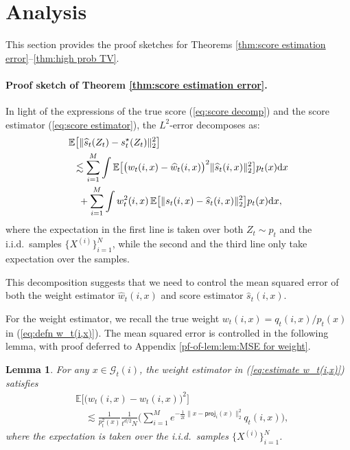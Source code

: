 \documentclass{article}
\newcommand{\bE}{\mathbb{E}}
\newcommand{\diff}{\,\mathrm{d}}
\newcommand{\proj}{\mathsf{proj}}
\theoremstyle{plain}
\newtheorem{lemma}{\bf Lemma}
\theoremstyle{remark}
\begin{document}
\section{Analysis}
\label{sec:proof overview}
This section provides the proof sketches for Theorems \ref{thm:score estimation error}--\ref{thm:high prob TV}.

\paragraph{Proof sketch of Theorem \ref{thm:score estimation error}.}

In light of the expressions of the true score (\ref{eq:score decomp}) and the score estimator (\ref{eq:score estimator}), the $L^2$-error decomposes as:
\begin{align}
    &\mathbb{E}\big[\|\widehat{s}_t(Z_t)-s_t^\star(Z_t)\|_2^2\big] \notag \\
    &\,\,\, \lesssim \sum_{i=1}^M \int \bE\big[\big(w_t(i,x)-\widehat{w}_t(i,x)\big)^2 \|\widehat{s}_t(i,x) \|_2^2 \big] p_t(x) \!\diff x \notag\\
    &\quad + \sum_{i=1}^M \int w_t^2(i,x) \, \bE\big[\| s_t(i,x) - \widehat{s}_t(i,x) \|_2^2 \big] p_t(x) \! \diff x, \label{eq:22}
\end{align}
where the expectation in the first line is taken over both $Z_t\sim p_t$ and the i.i.d.\ samples $\{ X^{(i)}\}_{i=1}^N$, while the second and the third line only take expectation over the samples.

This decomposition suggests that we need to control the  mean squared error of both the weight estimator $\widehat{w}_t(i,x)$ and score estimator $\widehat{s}_t(i,x)$.

For the weight estimator, we recall the true weight $w_{t}(i,x) = q_t(i,x)/p_t(x)$ in (\ref{eq:defn w_t(i,x)}).
The mean squared error is controlled in the following lemma, with proof deferred to Appendix \ref{pf-of-lem:lem:MSE for weight}.
\begin{lemma}
    \label{lem:MSE for weight}
    For any $x \in \mathcal{G}_t(i)$, the weight estimator in (\ref{eq:estimate w_t(i,x)}) satisfies
    \begin{align*}
        &\mathbb{E}\big[\big(w_t(i,x) -\widehat{w}_t(i,x) \big)^2 \big] \\
        & \quad\lesssim  \frac{1}{p_t^2(x)} \frac{1}{t^{d/2}N} \Big(\sum_{i=1}^M e^{-\frac{1}{2t}\|x-\proj_i(x)\|_2^2} q_t(i,x) \Big),
    \end{align*}
    where the expectation is taken over the i.i.d.\ samples $\{ X^{(i)}\}_{i=1}^N$. 
\end{lemma}
\end{document}
